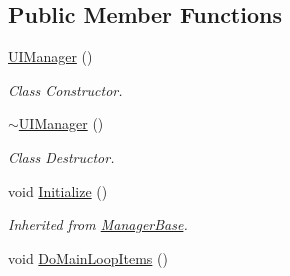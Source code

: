 \subsection*{Public Member Functions}
\begin{DoxyCompactItemize}
\item 
\hyperlink{classphys_1_1UIManager_aeb502f11f170efd806b4153923c55359}{UIManager} ()
\begin{DoxyCompactList}\small\item\em Class Constructor. \item\end{DoxyCompactList}\item 
\hyperlink{classphys_1_1UIManager_a203144f08dbaf8068746359c22aa4f1e}{$\sim$UIManager} ()
\begin{DoxyCompactList}\small\item\em Class Destructor. \item\end{DoxyCompactList}\item 
\hypertarget{classphys_1_1UIManager_af04e60c4f09c114ec3bf32babdb64ab7}{
void \hyperlink{classphys_1_1UIManager_af04e60c4f09c114ec3bf32babdb64ab7}{Initialize} ()}
\label{d5/dc5/classphys_1_1UIManager_af04e60c4f09c114ec3bf32babdb64ab7}

\begin{DoxyCompactList}\small\item\em Inherited from \hyperlink{classphys_1_1ManagerBase}{ManagerBase}. \item\end{DoxyCompactList}\item 
\hypertarget{classphys_1_1UIManager_a972abedcd4343dc5966580f2f82494a8}{
void \hyperlink{classphys_1_1UIManager_a972abedcd4343dc5966580f2f82494a8}{DoMainLoopItems} ()}
\label{d5/dc5/classphys_1_1UIManager_a972abedcd4343dc5966580f2f82494a8}


\end{DoxyCompactItemize}

